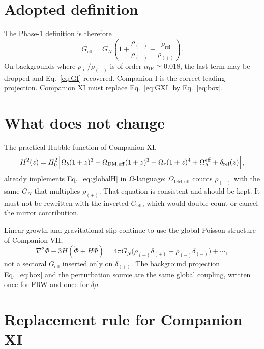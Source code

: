 \documentclass[11pt,a4paper]{article}
\begin{document}
\section{Adopted definition}

The Phase-1 definition is therefore
\begin{equation}
  \boxed{
    G_{\mathrm{eff}}
    =
    G_N
    \left(
      1
      +
      \frac{\rho_{(-)}}{\rho_{(+)}}
      +
      \frac{\rho_{\mathrm{rel}}}{\rho_{(+)}}
    \right).
  }
  \label{eq:box}
\end{equation}
On backgrounds where \(\rho_{\mathrm{rel}}/\rho_{(+)}\) is of order
\(\alpha_{\mathrm{IR}}\simeq0.018\), the last term may be dropped and
Eq.~\eqref{eq:GI} recovered. Companion I is the correct leading projection.
Companion XI must replace Eq.~\eqref{eq:GXI} by Eq.~\eqref{eq:box}.

\section{What does not change}

The practical Hubble function of Companion XI,
\begin{equation}
  H^2(z)
  =
  H_0^2
  \Bigl[
    \Omega_b(1+z)^3
    +
    \Omega_{\mathrm{DM,eff}}(1+z)^3
    +
    \Omega_r(1+z)^4
    +
    \Omega_\Lambda^{\mathrm{eff}}
    +
    \delta_{\mathrm{rel}}(z)
  \Bigr],
\end{equation}
already implements Eq.~\eqref{eq:globalH} in \(\Omega\)-language:
\(\Omega_{\mathrm{DM,eff}}\) counts \(\rho_{(-)}\) with the same \(G_N\)
that multiplies \(\rho_{(+)}\). That equation is consistent and should be
kept. It must not be rewritten with the inverted \(G_{\mathrm{eff}}\),
which would double-count or cancel the mirror contribution.

Linear growth and gravitational slip continue to use the global Poisson
structure of Companion VII,
\begin{equation}
  \nabla^2\Phi-3H(\dot\Phi+H\Phi)
  =
  4\pi G_N
  \bigl(
    \rho_{(+)}\delta_{(+)}
    +
    \rho_{(-)}\delta_{(-)}
  \bigr)
  +
  \cdots,
\end{equation}
not a sectoral \(G_{\mathrm{eff}}\) inserted only on \(\delta_{(+)}\).
The background projection Eq.~\eqref{eq:box} and the perturbation source
are the same global coupling, written once for FRW and once for
\(\delta\rho\).

\section{Replacement rule for Companion XI}
\end{document}
